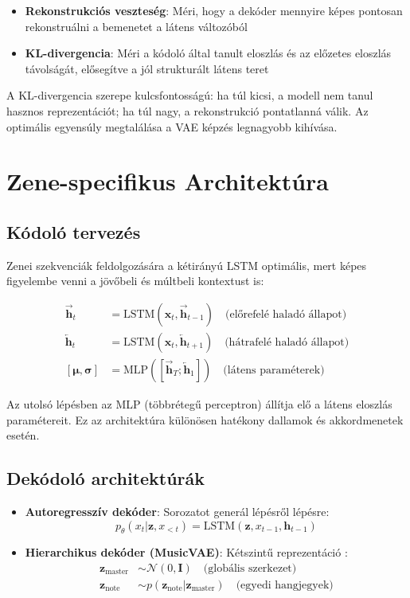 \begin{itemize}
    \item \textbf{Rekonstrukciós veszteség}: Méri, hogy a dekóder mennyire képes pontosan rekonstruálni a bemenetet a látens változóból
    \item \textbf{KL-divergencia}: Méri a kódoló által tanult eloszlás és az előzetes eloszlás távolságát, elősegítve a jól strukturált látens teret
\end{itemize}

A KL-divergencia szerepe kulcsfontosságú: ha túl kicsi, a modell nem tanul hasznos reprezentációt; ha túl nagy, a rekonstrukció pontatlanná válik. Az optimális egyensúly megtalálása a VAE képzés legnagyobb kihívása.

\section{Zene-specifikus Architektúra}
\subsection{Kódoló tervezés}
Zenei szekvenciák feldolgozására a kétirányú LSTM optimális, mert képes figyelembe venni a jövőbeli és múltbeli kontextust is:

\[
\begin{aligned}
\overrightarrow{\mathbf{h}}_t &= \text{LSTM}(\mathbf{x}_t, \overrightarrow{\mathbf{h}}_{t-1}) \quad \text{(előrefelé haladó állapot)} \\
\overleftarrow{\mathbf{h}}_t &= \text{LSTM}(\mathbf{x}_t, \overleftarrow{\mathbf{h}}_{t+1}) \quad \text{(hátrafelé haladó állapot)} \\
[\boldsymbol{\mu}, \boldsymbol{\sigma}] &= \text{MLP}([\overrightarrow{\mathbf{h}}_T; \overleftarrow{\mathbf{h}}_1]) \quad \text{(látens paraméterek)}
\end{aligned}
\]

Az utolsó lépésben az MLP (többrétegű perceptron) állítja elő a látens eloszlás paramétereit. Ez az architektúra különösen hatékony dallamok és akkordmenetek esetén.

\subsection{Dekódoló architektúrák}
\begin{itemize}
    \item \textbf{Autoregresszív dekóder}: Sorozatot generál lépésről lépésre:
    \[
    p_\theta(x_t|\mathbf{z}, x_{<t}) = \text{LSTM}(\mathbf{z}, x_{t-1}, \mathbf{h}_{t-1})
    \]
    \item \textbf{Hierarchikus dekóder (MusicVAE)}: Kétszintű reprezentáció \cite{roberts2018hierarchical}:
    \begin{align*}
        \mathbf{z}_{\text{master}} & \sim \mathcal{N}(0, \mathbf{I}) \quad \text{(globális szerkezet)} \\
        \mathbf{z}_{\text{note}} & \sim p(\mathbf{z}_{\text{note}}|\mathbf{z}_{\text{master}}) \quad \text{(egyedi hangjegyek)}
    \end{align*}
\end{itemize}

